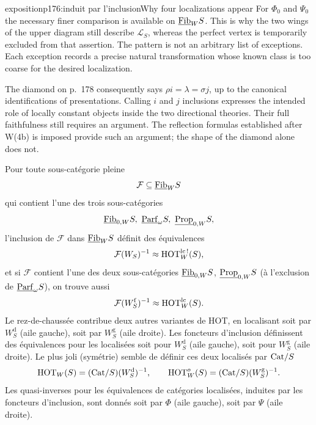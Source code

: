 \begin{dcomment}{exposition}{p176:induit par l'inclusion}{Why four localizations appear}
For $\Phi_0$ and $\Psi_0$ the necessary finer comparison is available on $\underline{\mathrm{Fib}}_W S$. This is why the two wings of the upper diagram still describe $\mathcal L_S$, whereas the perfect vertex is temporarily excluded from that assertion. The pattern is not an arbitrary list of exceptions. Each exception records a precise natural transformation whose known class is too coarse for the desired localization.

The diamond on p.~178 consequently says $\rho i=\lambda=\sigma j$, up to the canonical identifications of presentations. Calling $i$ and $j$ inclusions expresses the intended role of locally constant objects inside the two directional theories. Their full faithfulness still requires an argument. The reflection formulas established after W(4b) is imposed provide such an argument; the shape of the diamond alone does not.
\end{dcomment}



\noindent{}
Pour toute sous-catégorie pleine
\[
\mathcal{F} \subseteq \underline{\mathrm{Fib}}_W S
\]
qui contient l’une des trois sous-catégories
\[
\Fib_{0,W}S,\ \Parf_\omega S,\ \Prop_{0,W}S,
\]
l’inclusion de $\mathcal{F}$ dans $\underline{\mathrm{Fib}}_W S$ définit des équivalences
\[
\mathcal{F}(W_S)^{-1} \approx \mathrm{HOT}^{\mathrm{lc}\,!}_W(S),
\]
et si $\mathcal{F}$ contient l’une des deux sous-catégories $\underline{\mathrm{Fib}}_{0,W}S$, $\underline{\mathrm{Prop}}_{0,W}S$ (à l’exclusion de $\underline{\mathrm{Parf}}_\omega S$), on trouve aussi
\[
\mathcal{F}(W^{\mathrm{f}}_S)^{-1} \approx \mathrm{HOT}^{\mathrm{lc}}_W(S).
\]
Le rez-de-chaussée contribue deux autres variantes de HOT, en localisant soit par $W^{\mathrm{d}}_S$ (aile gauche), soit par $W^{\mathrm{g}}_S$ (aile droite). Les foncteurs d’inclusion définissent des équivalences pour les localisées soit pour $W^{\mathrm{d}}_S$ (aile gauche), soit pour $W^{\mathrm{g}}_S$ (aile droite). Le plus joli (symétrie) semble de définir ces deux localisés par $\mathrm{Cat}/S$
\[
\mathrm{HOT}_W(S) = (\mathrm{Cat}/S)(W^{\mathrm{d}}_S)^{-1}, \qquad \mathrm{HOT}^{o}_W(S) = (\mathrm{Cat}/S)(W^{\mathrm{g}}_S)^{-1}.
\]
Les quasi-inverses pour les équivalences de catégories localisées, induites par les foncteurs d’inclusion, sont donnés soit par $\Phi$ (aile gauche), soit par $\Psi$ (aile droite).

